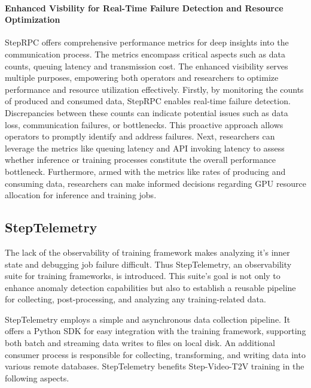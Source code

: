 \paragraph{Enhanced Visbility for Real-Time Failure Detection and Resource Optimization} StepRPC offers comprehensive performance metrics for deep insights into the communication process. The metrics encompass critical aspects such as data counts, queuing latency and transmission cost. The enhanced visibility serves multiple purposes, empowering both operators and researchers to optimize performance and resource utilization effectively. Firstly, by monitoring the counts of produced and consumed data, StepRPC enables real-time failure detection. Discrepancies between these counts can indicate potential issues such as data loss, communication failures, or bottlenecks. This proactive approach allows operators to promptly identify and address failures. Next, researchers can leverage the metrics like queuing latency and API invoking latency to assess whether inference or training processes constitute the overall performance bottleneck.
Furthermore, armed with the metrics like rates of producing and consuming data, researchers can make informed decisions regarding GPU resource allocation for inference and training jobs.



\subsection{StepTelemetry}
\label{subsec:system_telemetry}

The lack of the observability of training framework makes analyzing it's inner state and debugging job failure difficult. Thus StepTelemetry, an observability suite for training frameworks, is introduced. This suite's goal is not only to enhance anomaly detection capabilities but also to establish a reusable pipeline for collecting, post-processing, and analyzing any training-related data.

StepTelemetry employs a simple and asynchronous data collection pipeline. It offers a Python SDK for easy integration with the training framework, supporting both batch and streaming data writes to files on local disk. An additional consumer process  is responsible for collecting, transforming, and writing data into various remote databases. StepTelemetry benefits Step-Video-T2V training in the following aspects.

